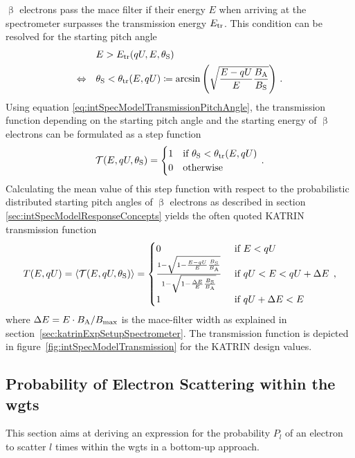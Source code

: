 $\upbeta$ electrons pass the \gls{mace} filter if their energy $E$ when arriving at the spectrometer surpasses the transmission energy $E_\mathrm{tr}$. This condition can be resolved for the starting pitch angle~\cite{Groh2015}
\begin{align}
&E > E_\mathrm{tr}(qU,E,\theta_\mathrm{S}) \nonumber \\
\Leftrightarrow \quad
& \theta_\mathrm{S} < \theta_\mathrm{tr}(E,qU)
\coloneqq
\arcsin
\left(\sqrt{
	\frac{E-qU}{E} 
	\frac{B_\mathrm{A}}{B_\mathrm{S}}
}\right)
\text{\,.}
\label{eq:intSpecModelTransmissionPitchAngle}
\end{align}
Using equation \eqref{eq:intSpecModelTransmissionPitchAngle}, the transmission function depending on the starting pitch angle and the starting energy of $\upbeta$ electrons can be formulated as a step function
\begin{equation}
\label{eq:intSpecModelTransmissionStep}
\mathcal{T}(E, qU, \theta_\mathrm{S}) =
\begin{cases}
1 & \text{if } \theta_\mathrm{S} < \theta_\mathrm{tr}(E,qU) \\
0 & \text{otherwise} 
\end{cases}
\text{\,.}
\end{equation}
Calculating the mean value of this step function with respect to the probabilistic distributed starting pitch angles of $\upbeta$ electrons as described in section~ \ref{sec:intSpecModelResponseConcepts} yields the often quoted KATRIN transmission function~\cite{Angrik:2005ep}
\begin{equation}
\label{eq:intSpecModelTransmission}
	T(E, qU) = 
	\left\langle{\mathcal{T}(E, qU, \theta_\mathrm{S})}\right\rangle =
	\begin{cases}
	0 & \text{ if } E < qU \\
	\frac{
		1-\sqrt{
			1-\frac{E-qU}{E} 
			\frac{B_\mathrm{S}}{B_\mathrm{A}}
		} 
	}{
		1-\sqrt{1-\frac{\Delta E}{E}\frac{B_\mathrm{S}}{B_\mathrm{A}}}
	}
	& \text{ if } qU < E < qU + \Delta E \\
	1 & \text{ if } qU + \Delta E < E
	\end{cases}
	\text{\,,}
\end{equation}
where $\Delta E=E\cdot B_\mathrm{A}/B_\mathrm{max}$ is the \gls{mace}-filter width as explained in section~\ref{sec:katrinExpSetupSpectrometer}. The transmission function is depicted in figure~\ref{fig:intSpecModelTransmission} for the KATRIN design values.

\subsection{Probability of Electron Scattering within the \gls{wgts}}
\label{sec:intSpecModelResponseScattering}
This section aims at deriving an expression for the probability $P_l$ of an electron to scatter $l$ times within the \gls{wgts} in a bottom-up approach.


